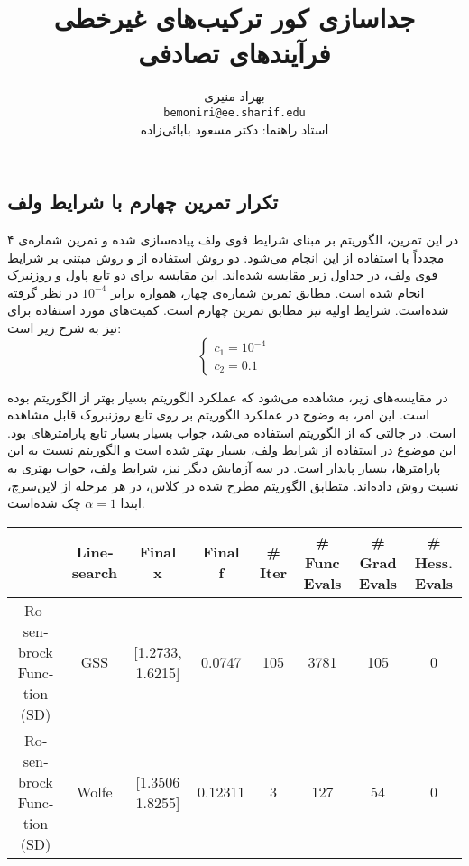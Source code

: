 \documentclass{article}
\title{جداسازی کور ترکیب‌های غیرخطی فرآیند‌های تصادفی}
\author{
	بهراد منیری\\
	\texttt{bemoniri@ee.sharif.edu}
	\vspace{0.5cm}\\
	استاد راهنما:
	دکتر مسعود بابائی‌زاده
}
\date{}
\begin{document}
\begin{landscape}

 \section{تکرار تمرین چهارم با شرایط ولف}

در این تمرین، الگوریتم
بر مبنای شرایط قوی ولف پیاده‌سازی شده و تمرین شماره‌ی ۴ مجدداً با استفاده از این 
انجام می‌شود. دو روش 
استفاده از 
و روش مبتنی بر شرایط قوی ولف، در جداول زیر مقایسه شده‌اند. این مقایسه برای دو تابع پاول و روزنبرک انجام شده است. مطابق تمرین شماره‌ی چهار، همواره
برابر
$10^{-4}$
در نظر گرفته‌ شده‌است. شرایط اولیه نیز مطابق تمرین چهارم است.
 کمیت‌های مورد استفاده برای 
نیز به شرح زیر است:
\begin{equation*}
\begin{cases}
c_1 = 10^{-4}\\
c_2 = 0.1
\end{cases}
\end{equation*}


در مقایسه‌های زیر، مشاهده می‌شود که عملکرد الگوریتم
بسیار بهتر از الگوریتم
بوده است. این امر، به وضوح در عملکرد الگوریتم 
بر روی تابع روزنبروک قابل مشاهده است. در جالتی که از الگوریتم 
استفاده می‌شد، جواب بسیار بسیار تابع پارامتر‌های
بود. این موضوع در استفاده از شرایط ولف، بسیار بهتر شده است و الگوریتم نسبت به این پارامتر‌ها، بسیار پایدار است. در سه آزمایش دیگر نیز، شرایط ولف، جواب بهتری به نسبت روش
داده‌اند. متطابق الگوریتم مطرح شده در کلاس، در هر مرحله‌ از لاین‌سرچ، ابتدا 
$\alpha = 1$
چک شده‌است.
\vspace{3cm}	

\begin{latin}
\begin{table}[h!]
	\begin{tabular}{|c|c|c|c|c|c|c|c|}
		\hline
		
		& Linesearch & \textbf{Final x}  & Final f    & \# Iter & \# Func Evals  &\# Grad Evals & \# Hess. Evals \\ \hline
											
		Rosenbrock Function  (SD)     & GSS    & {[}1.2733, 1.6215{]}                                          & 0.0747     & 105     & 3781          & 105           & 0              \\	
			
		Rosenbrock Function  (SD)     & Wolfe    & {[}1.3506 1.8255{]}                                          &      0.12311
		& 3     & 127         & 54          & 0              \\	
		

\end{tabular}
\end{table}
\end{latin}
\end{landscape}
\end{document}
